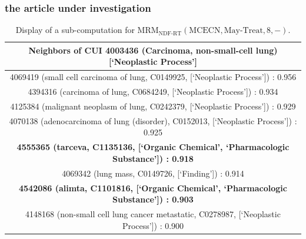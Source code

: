 \documentclass{beamer}
\newcommand\T{\rule{0pt}{2.6ex}}       %
\newcommand\B{\rule[-1.2ex]{0pt}{0pt}} %
\begin{document}
\begin{frame}
\frametitle{the article under investigation}

\begin{table}[t]
\caption{\centering
\scriptsize Display of a sub-computation for $\text{MRM}_{\text{NDF-RT}}(\text{MCECN},\text{May-Treat},8,-)$. 
}{
\tiny
\begin{center}
\begin{tabular}{|c|} 
\hline
Neighbors of CUI 4003436 (Carcinoma, non-small-cell lung) [`Neoplastic Process'] 
\T \B \\ 
\hline
4069419 (small cell carcinoma of lung, C0149925,  [`Neoplastic Process']) : 0.956 \T \B \\
4394316 (carcinoma of lung, C0684249,  [`Neoplastic Process']) : 0.934 
\T \B \\
4125384 (malignant neoplasm of lung, C0242379,  [`Neoplastic Process']) : 0.929 \T \B \\
4070138 (adenocarcinoma of lung (disorder), C0152013,  [`Neoplastic Process']) : 0.925\T \B \\
\textbf{4555365 (tarceva, C1135136,  [`Organic Chemical', `Pharmacologic Substance']) : 0.918} \T \B \\
4069342 (lung mass, C0149726,  [`Finding']) : 0.914 \T \B \\
\textbf{4542086 (alimta, C1101816,  [`Organic Chemical', `Pharmacologic Substance']) : 0.903} \T \B \\
4148168 (non-small cell lung cancer metastatic, C0278987,  [`Neoplastic Process']) : 0.900 \T \B \\
\hline
\end{tabular}
\end{center}
}
\end{table}
\end{frame}
\end{document}
